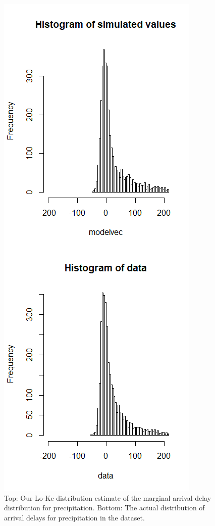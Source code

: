 \documentclass[12pt, a4paper, openany]{book}
\begin{document}
			\begin{figure}[h]
			\centering
	 		\includegraphics[width = .5 \textwidth]{../figures/highprcp}
	 		\caption{Top: Our Lo-Ke distribution estimate of the marginal arrival delay distribution for precipitation. Bottom: The actual distribution of arrival delays for precipitation in the dataset.}
	 		\end{figure}	
	 		
\end{document}
